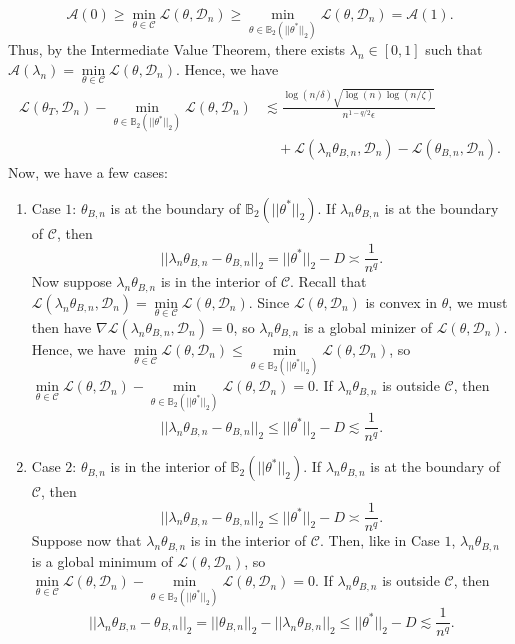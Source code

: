 \documentclass{article}
\begin{document}
$$\mathcal{A}(0) \geq \mathop{\min}\limits_{\theta \in \mathcal{C}}\mathcal{L}(\theta, \mathcal{D}_n) \geq \mathop{\min}\limits_{\theta \in \mathbb{B}_2(||\theta^*||_2)}\mathcal{L}(\theta, \mathcal{D}_n) = \mathcal{A}(1).$$ Thus, by the Intermediate Value Theorem, there exists $\lambda_n \in [0, 1]$ such that $\mathcal{A}(\lambda_n) = \mathop{\min}\limits_{\theta \in \mathcal{C}}\mathcal{L}(\theta, \mathcal{D}_n)$. Hence, we have
\begin{align*}
\mathcal{L}(\theta_T, \mathcal{D}_n) - \mathop{\min}\limits_{\theta \in \mathbb{B}_2(||\theta^*||_2)}\mathcal{L}(\theta, \mathcal{D}_n) &\lesssim \frac{\log(n/\delta)\sqrt{\log(n)\log(n/\zeta)}}{n^{1 - q/2}\epsilon}\\
& \quad + \mathcal{L}(\lambda_n\theta_{B, n}, \mathcal{D}_n) - \mathcal{L}(\theta_{B, n}, \mathcal{D}_n).
\end{align*}
Now, we have a few cases:
\begin{enumerate}
\item Case $1$: $\theta_{B, n}$ is at the boundary of $\mathbb{B}_2(||\theta^*||_2)$. If $\lambda_n\theta_{B, n}$ is at the boundary of $\mathcal{C}$, then $$||\lambda_n\theta_{B, n} - \theta_{B, n}||_2 = ||\theta^*||_2 - D \asymp \frac{1}{n^q}.$$
Now suppose $\lambda_n\theta_{B, n}$ is in the interior of $\mathcal{C}$. Recall that $\mathcal{L}(\lambda_n\theta_{B, n}, \mathcal{D}_n) = \mathop{\min}\limits_{\theta \in \mathcal{C}}\mathcal{L}(\theta, \mathcal{D}_n)$. Since $\mathcal{L}(\theta, \mathcal{D}_n)$ is convex in $\theta$, we must then have $\nabla \mathcal{L}(\lambda_n\theta_{B, n}, \mathcal{D}_n) = 0$, so $\lambda_n\theta_{B, n}$ is a global minizer of $\mathcal{L}(\theta, \mathcal{D}_n)$. Hence, we have $\mathop{\min}\limits_{\theta \in \mathcal{C}}\mathcal{L}(\theta, \mathcal{D}_n) \leq \mathop{\min}\limits_{\theta \in \mathbb{B}_2(||\theta^*||_2)}\mathcal{L}(\theta, \mathcal{D}_n)$, so $\mathop{\min}\limits_{\theta \in \mathcal{C}}\mathcal{L}(\theta, \mathcal{D}_n) - \mathop{\min}\limits_{\theta \in \mathbb{B}_2(||\theta^*||_2)}\mathcal{L}(\theta, \mathcal{D}_n) = 0$. If $\lambda_n\theta_{B, n}$ is outside $\mathcal{C}$, then
$$||\lambda_n\theta_{B, n} - \theta_{B, n}||_2 \leq ||\theta^*||_2 - D \lesssim \frac{1}{n^q}.$$
\item Case $2$: $\theta_{B, n}$ is in the interior of $\mathbb{B}_2(||\theta^*||_2)$. If $\lambda_n\theta_{B, n}$ is at the boundary of $\mathcal{C}$, then $$||\lambda_n\theta_{B, n} - \theta_{B, n}||_2 \leq ||\theta^*||_2 - D \asymp \frac{1}{n^q}.$$
Suppose now that $\lambda_n\theta_{B, n}$ is in the interior of $\mathcal{C}$. Then, like in Case $1$, $\lambda_n\theta_{B, n}$ is a global minimum of $\mathcal{L}(\theta, \mathcal{D}_n)$, so $\mathop{\min}\limits_{\theta \in \mathcal{C}}\mathcal{L}(\theta, \mathcal{D}_n) - \mathop{\min}\limits_{\theta \in \mathbb{B}_2(||\theta^*||_2)}\mathcal{L}(\theta, \mathcal{D}_n) = 0$. If $\lambda_n\theta_{B, n}$ is outside $\mathcal{C}$, then $$||\lambda_n\theta_{B, n} - \theta_{B, n}||_2 = ||\theta_{B, n}||_2 - ||\lambda_n\theta_{B, n}||_2 \leq ||\theta^*||_2 - D \lesssim \frac{1}{n^q}.$$
\end{enumerate}
\end{document}
